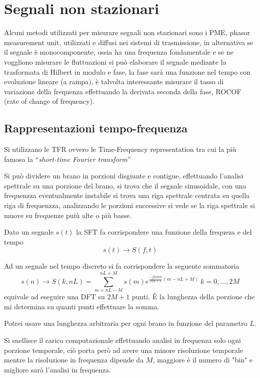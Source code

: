 
\section{Segnali non stazionari}

Alcuni metodi utilizzati per misurare segnali non stazionari sono i PME, phasor
measurement unit, utilizzati e diffusi nei sistemi di trasmissione, in
alternativa se il segnale è monocomponente, ossia ha una frequenza fondamentale
e se ne voggliono misurare le fluttuazioni si può elaborare il segnale mediante
la trasformata di Hilbert in modulo e fase, la fase sarà una funzione nel tempo
con evoluzione lineare (a rampa), è talvolta interessante misurare il tasso di
variazione della frequenza effettuando la derivata seconda della fase, ROCOF
(rate of change of frequency).


\subsection{Rappresentazioni tempo-frequenza}
Si utilizzano le TFR ovvero le Time-Frequency representation tra cui la più
famosa la ``\textit{short-time Fourier transform}''

Si può dividere un brano in porzioni disgiunte e contigue, effettuando
l'analisi spettrale su una porzione del brano, si trova che il segnale
sinusoidale, con una frequenzza eventualmente instabile si trova una riga
spettrale centrata su quella riga di frequenzza, analizzando le porzioni
successive si vede se la riga spettrale si muove su frequenze puiù alte o più
basse.

Dato un segnale $s(t)$ la SFT fa corrispondere una funzione della frequeza e
del tempo
$$
s(t) \longrightarrow S(f,t)
$$

Ad un segnale nel tempo discreto si fa corrispondere la seguente sommatoria
$$
s(n) \longrightarrow S(k,nL) = \sum_{m=nL-M}^{nL+M} s(m)e^{\frac{-j2\pi k
m}{2M+1}\left(m-nL+M\right)}\ k=0,\dots , 2M
$$
equivale ad eseguire una DFT su $2M+1$ punti. È la lunghezza della porzione che
mi determina su quanti punti effettuare la somma.

Potrei usare una lunghezza arbitraria per ogni brano in funzione del parametro 
$L$.

Si snellisce il carico computazionale effettuando analisi in frequenza solo ogni
porzione temporale, ciò porta però ad avere una minore risoluzione temporale mentre
la risoluzione in frequenza dipende da $M$, maggiore è il numero di "bin" e migliore 
sarà l'analisi in frequenza. 


